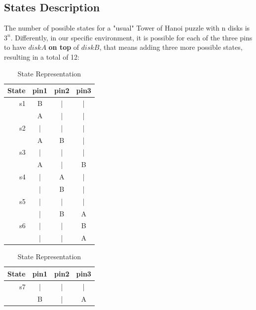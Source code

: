 \documentclass[11pt]{article}
\numberwithin{equation}{section}
\numberwithin{table}{section}
\numberwithin{figure}{secation}
\begin{document}
{		\subsection{States Description}
		The number of possible states for a "usual" Tower of Hanoi puzzle with n disks is $3^{n}$. Differently, in our specific environment, it is possible for each of the three pins to have $diskA$ \textbf{on top} of $diskB$, that means adding three more possible states, resulting in a total of 12:
		

 \begin{table}[!htb]
    \caption{State Representation}
    \begin{minipage}{.5\linewidth}
      \centering
        \begin{tabular}{|r|ccc|}\hline
        State&pin1&pin2&pin3\\ \hline
        s1   &B   &| &|     \\ 
             &A   &| &|     \\ \hline 
             
        s2   &|   &| &|     \\ 
             &A   &B &|     \\ \hline
             
        s3   &|   &| &|     \\ 
             &A   &| &B     \\ \hline 
             
        s4   &|   &A &|     \\ 
             &|   &B &|     \\ \hline 
             
        s5   &|   &| &|     \\ 
             &|   &B &A     \\ \hline
             
        s6   &|   &| &B     \\ 
             &|   &| &A     \\ \hline
        \end{tabular}
    \end{minipage}%
    \begin{minipage}{.5\linewidth}
      \centering
         \begin{tabular}{|r|ccc|}\hline
        State&pin1&pin2&pin3\\ \hline
        s7   &|   &| &|     \\ 
             &B   &| &A     \\ \hline
             

\end{tabular}
\end{minipage}
\end{table}}
\end{document}

